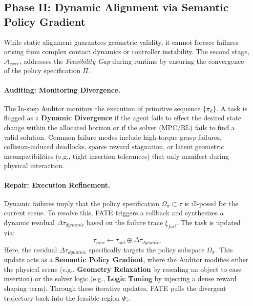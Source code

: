 \documentclass{article}
\theoremstyle{plain}
\theoremstyle{definition}
\theoremstyle{remark}
\begin{document}
\subsection{Phase II: Dynamic Alignment via Semantic Policy Gradient}
\label{subsec:dynamic_alignment}

While static alignment guarantees geometric validity, it cannot foresee failures arising from complex contact dynamics or controller instability. The second stage, $\mathcal{A}_{exec}$, addresses the \textit{Feasibility Gap} during runtime by ensuring the convergence of the policy specification $\Pi$.

\paragraph{Auditing: Monitoring Divergence.}
The In-step Auditor monitors the execution of primitive sequence $\{ \pi_k \}$. A task is flagged as a \textbf{Dynamic Divergence} if the agent fails to effect the desired state change within the allocated horizon or if the solver (MPC/RL) fails to find a valid solution. Common failure modes include high-torque grasp failures, collision-induced deadlocks, sparse reward stagnation, or latent geometric incompatibilities (e.g., tight insertion tolerances) that only manifest during physical interaction.

\paragraph{Repair: Execution Refinement.}
Dynamic failures imply that the policy specification $\Omega_\pi \subset \tau$ is ill-posed for the current scene. To resolve this, FATE triggers a rollback and synthesizes a dynamic residual $\Delta\tau_{dynamic}$ based on the failure trace $\xi_{fail}$. The task is updated via:
\begin{equation}
    \tau_{new} \leftarrow \tau_{old} \oplus \Delta\tau_{dynamic}
\end{equation}
Here, the residual $\Delta\tau_{dynamic}$ specifically targets the policy subspace $\Omega_\pi$. This update acts as a \textbf{Semantic Policy Gradient}, where the Auditor modifies either the physical scene (e.g., \textbf{Geometry Relaxation} by rescaling an object to ease insertion) or the solver logic (e.g., \textbf{Logic Tuning} by injecting a dense reward shaping term). Through these iterative updates, FATE pulls the divergent trajectory back into the feasible region $\Phi_\tau$.
\end{document}
